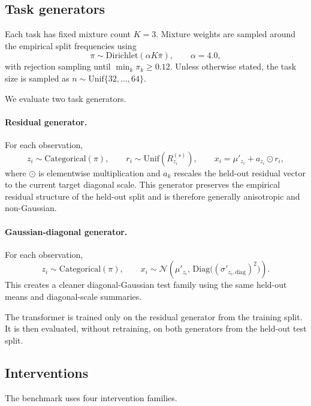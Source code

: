 \documentclass{article}
\begin{document}
\subsection{Task generators}
Each task has fixed mixture count $K=3$. Mixture weights are sampled around the empirical split frequencies using
\begin{equation}
\pi \sim \mathrm{Dirichlet}(\alpha K \bar{\pi}),
\qquad \alpha = 4.0,
\end{equation}
with rejection sampling until $\min_k \pi_k \ge 0.12$. Unless otherwise stated, the task size is sampled as $n \sim \mathrm{Unif}\{32,\dots,64\}$.

We evaluate two task generators.

\paragraph{Residual generator.}
For each observation,
\begin{equation}
z_i \sim \mathrm{Categorical}(\pi),
\qquad r_i \sim \mathrm{Unif}(R_{z_i}^{(s)}),
\qquad x_i = \mu'_{z_i} + a_{z_i} \odot r_i,
\end{equation}
where $\odot$ is elementwise multiplication and $a_k$ rescales the held-out residual vector to the current target diagonal scale. This generator preserves the empirical residual structure of the held-out split and is therefore generally anisotropic and non-Gaussian.

\paragraph{Gaussian-diagonal generator.}
For each observation,
\begin{equation}
z_i \sim \mathrm{Categorical}(\pi),
\qquad x_i \sim \mathcal{N}\!\left(\mu'_{z_i},\, \mathrm{Diag}\bigl((\sigma'_{z_i,\mathrm{diag}})^2\bigr)\right).
\end{equation}
This creates a cleaner diagonal-Gaussian test family using the same held-out means and diagonal-scale summaries.

The transformer is trained only on the residual generator from the training split. It is then evaluated, without retraining, on both generators from the held-out test split.

\subsection{Interventions}
The benchmark uses four intervention families.
\end{document}
